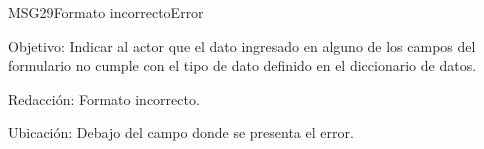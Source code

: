 \begin{mensaje}{MSG29}{Formato incorrecto}{Error}
	\item [Objetivo:] Indicar al actor que el dato ingresado en alguno de los campos del formulario no cumple con el tipo de dato definido en el diccionario de datos.
	\item[Redacción:] Formato incorrecto.
	\item [Ubicación:] Debajo del campo donde se presenta el error.
\end{mensaje}